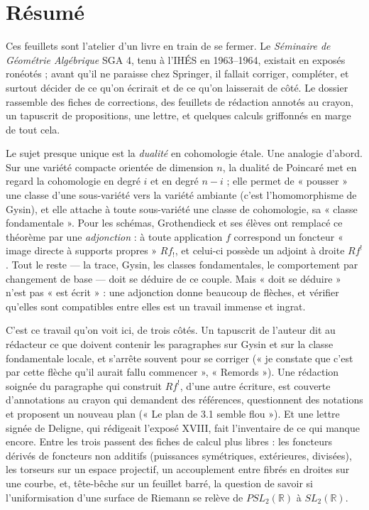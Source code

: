 \documentclass[11pt,a4paper]{article}
\begin{document}
\section*{Résumé}

\begin{resume}
Ces feuillets sont l'atelier d'un livre en train de se fermer. Le
\emph{Séminaire de Géométrie Algébrique} SGA 4, tenu à l'IHÉS en 1963--1964,
existait en exposés ronéotés ; avant qu'il ne paraisse chez Springer, il fallait
corriger, compléter, et surtout décider de ce qu'on écrirait et de ce qu'on
laisserait de côté. Le dossier rassemble des fiches de corrections, des
feuillets de rédaction annotés au crayon, un tapuscrit de propositions, une
lettre, et quelques calculs griffonnés en marge de tout cela.

Le sujet presque unique est la \emph{dualité} en cohomologie étale. Une
analogie d'abord. Sur une variété compacte orientée de dimension $n$, la
dualité de Poincaré met en regard la cohomologie en degré $i$ et en degré
$n-i$ ; elle permet de « pousser » une classe d'une sous-variété vers la
variété ambiante (c'est l'homomorphisme de Gysin), et elle attache à toute
sous-variété une classe de cohomologie, sa « classe fondamentale ». Pour les
schémas, Grothendieck et ses élèves ont remplacé ce théorème par une
\emph{adjonction} : à toute application $f$ correspond un foncteur « image
directe à supports propres » $Rf_!$, et celui-ci possède un adjoint à droite
$Rf^!$. Tout le reste --- la trace, Gysin, les classes fondamentales, le
comportement par changement de base --- doit se déduire de ce couple. Mais
« doit se déduire » n'est pas « est écrit » : une adjonction donne beaucoup de
flèches, et vérifier qu'elles sont compatibles entre elles est un travail
immense et ingrat.

C'est ce travail qu'on voit ici, de trois côtés. Un tapuscrit de l'auteur dit
au rédacteur ce que doivent contenir les paragraphes sur Gysin et sur la
classe fondamentale locale, et s'arrête souvent pour se corriger (« je
constate que c'est par cette flèche qu'il aurait fallu commencer »,
« Remords »). Une rédaction soignée du paragraphe qui construit $Rf^!$, d'une
autre écriture, est couverte d'annotations au crayon qui demandent des
références, questionnent des notations et proposent un nouveau plan (« Le plan
de 3.1 semble flou »). Et une lettre signée de Deligne, qui rédigeait
l'exposé XVIII, fait l'inventaire de ce qui manque encore. Entre les trois
passent des fiches de calcul plus libres : les foncteurs dérivés de foncteurs
non additifs (puissances symétriques, extérieures, divisées), les torseurs sur
un espace projectif, un accouplement entre fibrés en droites sur une courbe,
et, tête-bêche sur un feuillet barré, la question de savoir si l'uniformisation
d'une surface de Riemann se relève de $PSL_2(\mathbb{R})$ à $SL_2(\mathbb{R})$.


\end{resume}
\end{document}
